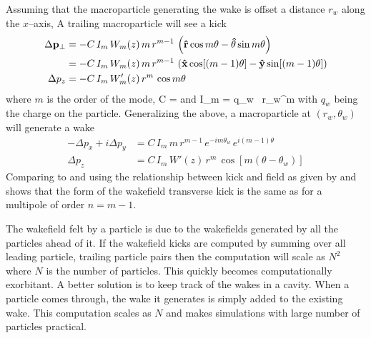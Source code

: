 Assuming that the macroparticle generating the wake is offset a
distance $r_w$ along the $x$--axis, A trailing macroparticle will see a kick
\begin{align}
  \Delta {{\bf p}}_\perp &= 
    -C \, I_m \, W_m(z) \, m \, r^{m-1} \, \left( 
    {\bf\hat r} \cos m\theta - {\bf\hat\theta} \sin m\theta \right) \\
  &= -C \, I_m \, W_m(z) \, m \, r^{m-1} \, \left( 
    {\bf\hat x} \cos [(m-1) \theta] - 
    {\bf\hat y} \sin [(m-1)\theta] \right) \nonumber \\
  \Delta p_z &= -C \, I_m \, W'_m(z) \, r^m \, \cos m\theta
\end{align}
where $m$ is the order of the mode,
\Begineq
  C = 
\Endeq
 and
\Begineq
  I_m = q_w \, r_w^m
\Endeq
with $q_w$ being the charge on the particle. Generalizing the above, a
macroparticle at $(r_w, \theta_w)$ will generate a wake
\begin{align}
  -\Delta p_x + i\Delta p_y &= C \, I_m \, 
    m \, r^{m-1} \, e^{-i m \theta_w} \, e^{i (m-1) \theta} 
    \label{ppcimr} \\
  \Delta p_z &= C \, I_m \, W'(z) \, r^m \, \cos [m(\theta - \theta_w)]
    \label{pciwr}
\end{align}
Comparing  to  and using the relationship between
kick and field as given by  and  shows that
the form of the wakefield transverse kick is the same as for a
multipole of order $n = m - 1$. 

The wakefield felt by a particle is due to the wakefields generated by
all the particles ahead of it. If the wakefield kicks are computed by
summing over all leading particle, trailing particle pairs then the
computation will scale as $N^2$ where $N$ is the number of
particles. This quickly becomes computationally exorbitant. A better
solution is to keep track of the wakes in a cavity. When a particle
comes through, the wake it generates is simply added to the existing
wake. This computation scales as $N$ and makes simulations with large
number of particles practical. 


